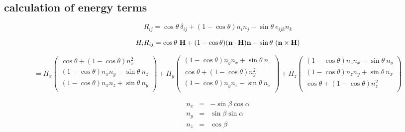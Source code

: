 \documentclass[a4paper]{article}
\begin{document}
\def\ct{\cos\theta}
\def\st{\sin\theta}

\def\cts{\cos^2\theta}
\def\sts{\sin^2\theta}

\def\ca{\cos\alpha}
\def\sa{\sin\alpha}

\def\cb{\cos\beta}
\def\sb{\sin\beta}

\def\bn{{\bf n}}
\def\bH{{\bf H}}
\def\bvsn{{(\bf v_s - v_n)}}

\subsection{calculation of energy terms}

$$
R_{ij} = \ct\ \delta_{ij} + (1-\ct) n_i n_j - \st\ e_{ijk} n_k
$$

$$
H_i R_{ij} = \ct\ \bH + (1-\ct) (\bn\cdot\bH) \bn - \st\ (\bn\times\bH)
$$


$$
=
H_x \left(
\begin{array}{l}
 \ct + (1-\ct) n_x^2\\
 (1-\ct) n_x n_y - \st\ n_z\\
 (1-\ct) n_x n_z + \st\ n_y\\
\end{array}
\right)
+H_y \left(
\begin{array}{l}
 (1-\ct) n_y n_x + \st\ n_z\\
 \ct + (1-\ct) n_y^2\\
 (1-\ct) n_y n_z - \st\ n_x\\
\end{array}
\right)
+H_z \left(
\begin{array}{l}
 (1-\ct) n_z n_x - \st\ n_y\\
 (1-\ct) n_z n_y + \st\ n_x\\
 \ct + (1-\ct) n_z^2\\
\end{array}
\right)
$$

\begin{eqnarray*}
 n_x &=& -\sb\ca\\
 n_y &=& \sb\sa\\
 n_z &=& \cb\\
\end{eqnarray*}
\end{document}
